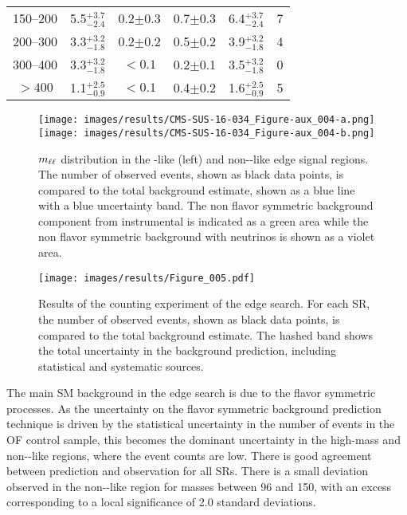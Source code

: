 \begin{table}[!hbtp]
\begin{tabular}{ c  c  c  c  c  c}
150--200  &  5.5$^{+3.7}_{-2.4}$    & 0.2$\pm$0.3   & 0.7$\pm$0.3  &  6.4$^{+3.7}_{-2.4}$ & 7 \\
200--300  &  3.3$^{+3.2}_{-1.8}$    & 0.2$\pm$0.2   & 0.5$\pm$0.2  &  3.9$^{+3.2}_{-1.8}$ & 4 \\
300--400  &  3.3$^{+3.2}_{-1.8}$    & $< 0.1$       & 0.2$\pm$0.1  &  3.5$^{+3.2}_{-1.8}$ & 0 \\
$> 400$   &  1.1$^{+2.5}_{-0.9}$    & $< 0.1$       & 0.4$\pm$0.2  &  1.6$^{+2.5}_{-0.9}$ & 5 \\
\hline
\hline
\end{tabular}
\end{table}
\begin{figure}[htbp!]
\begin{center}
\texttt{[image: images/results/CMS-SUS-16-034\_Figure-aux\_004-a.png]}
\texttt{[image: images/results/CMS-SUS-16-034\_Figure-aux\_004-b.png]}
\caption{$m_{\ell\ell}$ distribution in the \ttbar-like (left) and non-\ttbar-like edge signal regions. The number of observed events, shown as black data points, is compared to the total background estimate, shown as a blue line with a blue uncertainty band. The non flavor symmetric background component from instrumental \ptmiss is indicated as a green area while the non flavor symmetric background with neutrinos is shown as a violet area.}
\label{fig:resultsEdgeMll}
\end{center}
\end{figure}                                                                                                                                                                                   
\begin{figure}[htbp!]
\begin{center}
\texttt{[image: images/results/Figure\_005.pdf]}
\caption{Results of the counting experiment of the edge search. For each SR, the number of observed events, shown as black data points, is compared to the total background estimate.  The hashed band shows the total uncertainty in the background prediction, including statistical and systematic sources.}
\label{fig:resultsEdge}
\end{center}
\end{figure}                        
\noindent\justify                                                                                                                                               
The main SM background in the edge search is due to the flavor symmetric processes. 
As the uncertainty on the flavor symmetric background prediction technique is driven by the statistical uncertainty in the number of events in the OF control sample, this becomes the dominant uncertainty in the high-mass and non-\ttbar-like regions, where the event counts are low. 
There is good agreement between prediction and observation for all SRs. 
There is a small deviation observed in the non-\ttbar-like region for masses between 96 and 150\GeV, with an excess corresponding to a local significance of 2.0 standard deviations.
